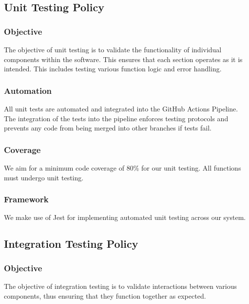 \documentclass[a4paper,12pt]{article}
\begin{document}
\subsection{Unit Testing Policy}

\subsubsection{Objective}

The objective of unit testing is to validate the functionality of individual components within the software. This ensures that each section operates as it is intended. This includes testing various function logic and error handling.

\subsubsection{Automation}

All unit tests are automated and integrated into the GitHub Actions Pipeline. The integration of the tests into the pipeline enforces testing protocols and prevents any code from being merged into other branches if tests fail.

\subsubsection{Coverage}

We aim for a minimum code coverage of 80\% for our unit testing. All functions must undergo unit testing.

\subsubsection{Framework}

We make use of Jest for implementing automated unit testing across our system.

\subsection{Integration Testing Policy}

\subsubsection{Objective}

The objective of integration testing is to validate interactions between various components, thus ensuring that they function together as expected.
\end{document}
